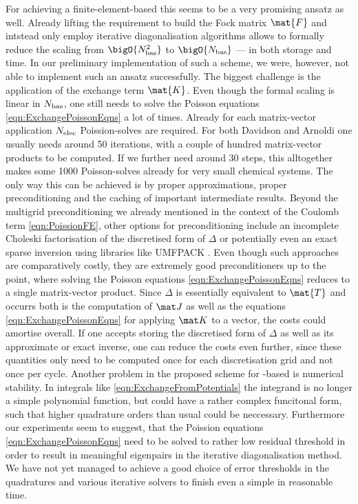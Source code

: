 For achieving a finite-element-based \HF
this seems to be a very promising ansatz as well.
Already lifting the requirement to build the Fock matrix $\mat{F}$
and intstead only employ
iterative diagonalisation algorithms
allows to formally reduce the scaling from $\bigO{\Nbas^2}$ to $\bigO{\Nbas}$
--- in both storage and time.
In our preliminary implementation of such a scheme,
we were, however, not able to implement such an ansatz successfully.
The biggest challenge is
the application of the exchange term $\mat{K}$.
Even though the formal scaling is linear in $N_\text{bas}$,
one still needs to solve the Poisson equations \eqref{eqn:ExchangePoissonEqns}
a lot of times.
Already for each matrix-vector application
$N_\text{elec}$ Poission-solves are required.
For both Davidson and Arnoldi one usually needs around 50 iterations,
with a couple of hundred matrix-vector products to be computed.
If we further need around 30 \SCF steps,
this alltogether makes some 1000 Poisson-solves
already for very small chemical systems.
The only way this can be achieved is by
proper approximations, proper preconditioning and
the caching of important intermediate results.
Beyond the multigrid preconditioning we already mentioned
in the context of the Coulomb term \eqref{eqn:PoissionFE},
other options for preconditioning include
an incomplete Choleski factorisation
of the discretised form of $\Delta$
or potentially even an exact sparse inversion
using libraries like UMFPACK
.
Even though such approaches are comparatively costly,
they are extremely good preconditioners up to the point,
where solving the Poisson equations \eqref{eqn:ExchangePoissonEqns}
reduces to a single matrix-vector product.
Since $\Delta$ is essentially equivalent to $\mat{T}$
and occurrs both is the computation of $\matJ$
as well as the equations \eqref{eqn:ExchangePoissonEqns}
for applying $\matK$ to a vector, the costs could amortise overall.
If one accepts storing the discretised form of $\Delta$
as well as its approximate or exact inverse,
one can reduce the costs even further,
since these quantities only need to be computed
once for each discretisation grid
and not once per \SCF cycle.
Another problem in the proposed scheme for \FE-based \HF
is numerical stability.
In integrals like \eqref{eqn:ExchangeFromPotentials}
the integrand is no longer a simple polynomial function,
but could have a rather complex funcitonal form,
such that higher quadrature orders than usual
could be neccessary.
Furthermore our experiments seem to suggest,
that the Poission equations \eqref{eqn:ExchangePoissonEqns}
need to be solved to rather low residual threshold
in order to result in meaningful eigenpairs
in the iterative diagonalisation method.
We have not yet managed to achieve
a good choice of error thresholds in the quadratures
and various iterative solvers to finish even a simple \SCF
in reasonable time.

